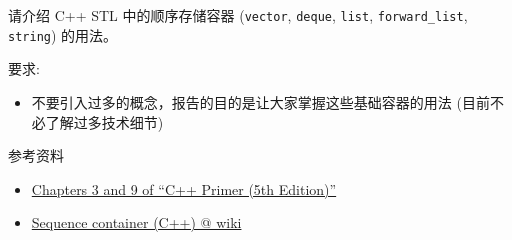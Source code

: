 \documentclass[a4paper, justified]{tufte-handout}
\begin{document}
\vspace{0.50cm}
\begin{ot}
  请介绍 C++ STL 中的顺序存储容器 
  (\texttt{vector}, \texttt{deque}, \texttt{list}, \texttt{forward\_list}, \texttt{string}) 的用法。

  \noindent 要求:
  \begin{itemize}
    \item 不要引入过多的概念，报告的目的是让大家掌握这些基础容器的用法 (目前不必了解过多技术细节)
  \end{itemize}

  \noindent 参考资料
  \begin{itemize}
    \item \href{http://ptgmedia.pearsoncmg.com/images/9780321714114/samplepages/0321714113.pdf}{Chapters 3 and 9 of ``C++ Primer (5th Edition)''}
    \item \href{https://en.wikipedia.org/wiki/Sequence\_container\_(C\%2B\%2B)}{Sequence container (C++) @ wiki}
  \end{itemize}
\end{ot}



\begincorrection


\beginfb

\end{document}
